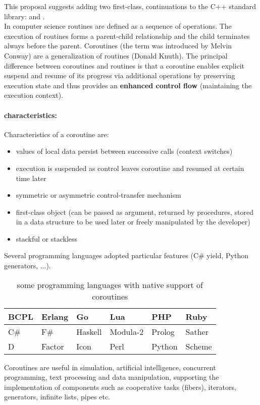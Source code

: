
This proposal suggests adding two first-class, continuations to the C++ standard
library: \pullcoro and \pushcoro.\\
\newline
In computer science routines are defined as a sequence of operations. The
execution of routines forms a parent-child relationship and the child terminates
always before the parent. Coroutines (the term was introduced by Melvin
Conway\cite{Conway1963}) are a generalization of routines (Donald
Knuth\cite{Knuth1997}). The principal difference between coroutines and routines
is that a coroutine enables explicit suspend and resume of its progress via
additional operations by preserving execution state and thus provides an
{\bf enhanced control flow} (maintaining the execution context).\\

\paragraph*{characteristics:}
Characteristics\cite{Moura2009} of a coroutine are:
\begin{itemize}
    \item values of local data persist between successive calls (context
          switches)
    \item execution is suspended as control leaves coroutine and resumed at
          certain time later
    \item symmetric or asymmetric control-transfer mechanism
    \item first-class object (can be passed as argument, returned by procedures,
          stored in a data structure to be used later or freely manipulated by
          the developer)
    \item stackful or stackless
\end{itemize}

Several programming languages adopted particular features (C\# yield, Python
generators, ...).
\begin{table}[h]
    \centering
    \begin{tabular}{ l l l l l l }
        \midrule
        BCPL    &   Erlang  &   Go      &   Lua         &   PHP     &   Ruby\\
        \midrule
        C\#     &   F\#     &   Haskell &   Modula-2    &   Prolog  &   Sather\\
        \midrule
        D       &   Factor  &   Icon    &   Perl        &   Python  &   Scheme\\
        \midrule
    \end{tabular}
    \caption{some programming languages with native support of coroutines
        \cite{wikipedia}}
\end{table}
\newline
Coroutines are useful in simulation, artificial intelligence, concurrent
programming, text processing and data manipulation\cite{Moura2009}, supporting
the implementation of components such as cooperative tasks (fibers), iterators,
generators, infinite lists, pipes etc.

